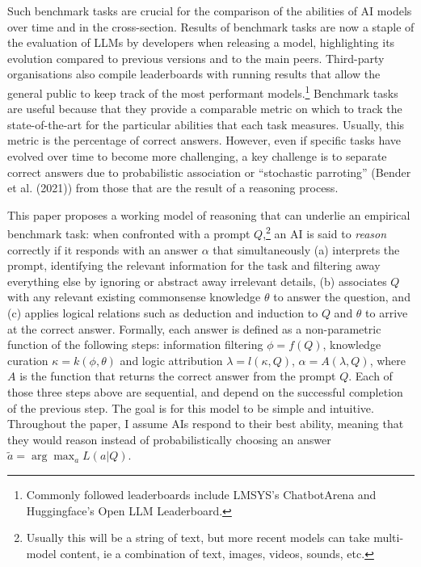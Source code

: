 \documentclass[
]{article}
\begin{document}
Such benchmark tasks are crucial for the comparison of the abilities of
AI models over time and in the cross-section. Results of benchmark tasks
are now a staple of the evaluation of LLMs by developers when releasing
a model, highlighting its evolution compared to previous versions and to
the main peers. Third-party organisations also compile leaderboards with
running results that allow the general public to keep track of the most
performant models.\footnote{Commonly followed leaderboards include
  LMSYS's ChatbotArena and Huggingface's Open LLM Leaderboard.}
Benchmark tasks are useful because that they provide a comparable metric
on which to track the state-of-the-art for the particular abilities that
each task measures. Usually, this metric is the percentage of correct
answers. However, even if specific tasks have evolved over time to
become more challenging, a key challenge is to separate correct answers
due to probabilistic association or ``stochastic parroting'' (Bender et
al. (2021)) from those that are the result of a reasoning process.

This paper proposes a working model of reasoning that can underlie an
empirical benchmark task: when confronted with a prompt
\(Q\),\footnote{Usually this will be a string of text, but more recent
  models can take multi-model content, ie a combination of text, images,
  videos, sounds, etc.} an AI is said to \emph{reason} correctly if it
responds with an answer \(\alpha\) that simultaneously (a) interprets
the prompt, identifying the relevant information for the task and
filtering away everything else by ignoring or abstract away irrelevant
details, (b) associates \(Q\) with any relevant existing commonsense
knowledge \(\theta\) to answer the question, and (c) applies logical
relations such as deduction and induction to \(Q\) and \(\theta\) to
arrive at the correct answer. Formally, each answer is defined as a
non-parametric function of the following steps: information filtering
\(\phi = f(Q)\), knowledge curation \(\kappa = k(\phi, \theta)\) and
logic attribution \(\lambda = l(\kappa, Q)\),
\(\alpha = A(\lambda, Q)\), where \(A\) is the function that returns the
correct answer from the prompt \(Q\). Each of those three steps above
are sequential, and depend on the successful completion of the previous
step. The goal is for this model to be simple and intuitive. Throughout
the paper, I assume AIs respond to their best ability, meaning that they
would reason instead of probabilistically choosing an answer
\(\tilde{a} = \arg \max_{a} L(a | Q)\).
\end{document}

